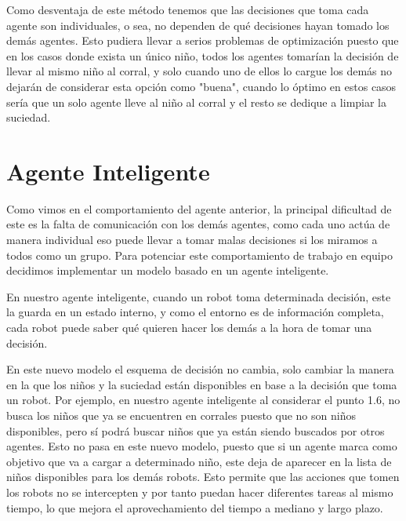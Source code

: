 \documentclass[]{article}
\begin{document}
\begin{flushleft}
	Como desventaja de este método tenemos que las decisiones que toma cada agente son individuales, o sea, no dependen de qué decisiones hayan tomado los demás agentes. Esto pudiera llevar a serios problemas de optimización puesto que en los casos donde exista un único niño, todos los agentes tomarían la decisión de llevar al mismo niño al corral, y solo cuando uno de ellos lo cargue los demás no dejarán de considerar esta opción como "buena", cuando lo óptimo en estos casos sería que un solo agente lleve al niño al corral y el resto se dedique a limpiar la suciedad.
\end{flushleft}

\section{Agente Inteligente}

\begin{flushleft}
	Como vimos en el comportamiento del agente anterior, la principal dificultad de este es la falta de comunicación con los demás agentes, como cada uno actúa de manera individual eso puede llevar a tomar malas decisiones si los miramos a todos como un grupo. Para potenciar este comportamiento de trabajo en equipo decidimos implementar un modelo basado en un agente inteligente.
\end{flushleft}

\begin{flushleft}
	En nuestro agente inteligente, cuando un robot toma determinada decisión, este la guarda en un estado interno, y como el entorno es de información completa, cada robot puede saber qué quieren hacer los demás a la hora de tomar una decisión.
\end{flushleft}

\begin{flushleft}
	En este nuevo modelo el esquema de decisión no cambia, solo cambiar la manera en la que los niños y la suciedad están disponibles en base a la decisión que toma un robot. Por ejemplo, en nuestro agente inteligente al considerar el punto 1.6, no busca los niños que ya se encuentren en corrales puesto que no son niños disponibles, pero sí podrá buscar niños que ya están siendo buscados por otros agentes. Esto no pasa en este nuevo modelo, puesto que si un agente marca como objetivo que va a cargar a determinado niño, este deja de aparecer en la lista de niños disponibles para los demás robots. Esto permite que las acciones que tomen los robots no se intercepten y por tanto puedan hacer diferentes tareas al mismo tiempo, lo que mejora el aprovechamiento del tiempo a mediano y largo plazo.
\end{flushleft}
 
\end{document}
